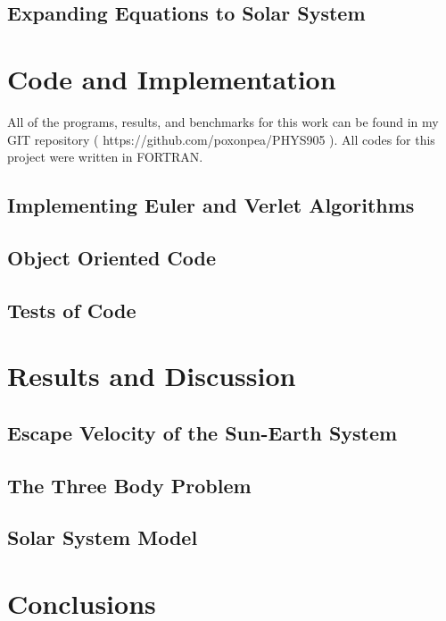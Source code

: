 \documentclass[%
oneside,                 %
final,                   %
10pt]{article}
\begin{document}
\subsection{Expanding Equations to Solar System}

\section{Code and Implementation}

All of the programs, results, and benchmarks for this work can be found in my GIT repository ( https://github.com/poxonpea/PHYS905 ).  All codes for this project were written in FORTRAN.

\subsection{Implementing Euler and Verlet Algorithms}

\subsection{Object Oriented Code}

\subsection{Tests of Code}

\section{Results and Discussion}


\subsection{Escape Velocity of the Sun-Earth System}

\subsection{The Three Body Problem}

\subsection{Solar System Model}


\section{Conclusions}
\end{document}
